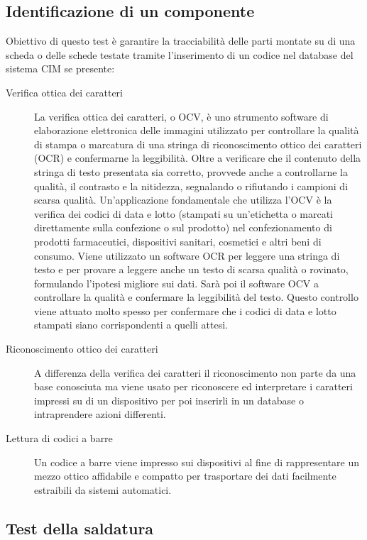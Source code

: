 \subsection{Identificazione di un componente}
Obiettivo di questo test è garantire la tracciabilità delle parti montate su di una scheda o delle schede
testate tramite l'inserimento di un codice nel database del sistema CIM se presente:
\begin{description}
\item[Verifica ottica dei caratteri]
La verifica ottica dei caratteri, o OCV, è uno strumento software di elaborazione elettronica delle immagini utilizzato per controllare la qualità di stampa o marcatura di una stringa di riconoscimento ottico dei caratteri (OCR) e confermarne la leggibilità. Oltre a verificare che il contenuto della stringa di testo presentata sia corretto, provvede anche a controllarne la qualità, il contrasto e la nitidezza, segnalando o rifiutando i campioni di scarsa qualità.
Un'applicazione fondamentale che utilizza l'OCV è la verifica dei codici di data e lotto (stampati su un'etichetta o marcati direttamente sulla confezione o sul prodotto) nel confezionamento di prodotti farmaceutici, dispositivi sanitari, cosmetici e altri beni di consumo.
Viene utilizzato un software OCR per leggere una stringa di testo e per provare a leggere anche un testo di scarsa qualità o rovinato, formulando l'ipotesi migliore sui dati. Sarà poi il software OCV a controllare la qualità e confermare la leggibilità del testo. Questo controllo viene attuato molto spesso per confermare che i codici di data e lotto stampati siano corrispondenti a quelli attesi.
\item [Riconoscimento ottico dei caratteri] A differenza della verifica dei caratteri il riconoscimento non parte da una base conosciuta ma viene usato per riconoscere ed interpretare i caratteri impressi su di un dispositivo per poi inserirli in un database o intraprendere azioni differenti.
\item [Lettura di codici a barre] Un codice a barre viene impresso sui dispositivi al fine di rappresentare un mezzo ottico affidabile e compatto per trasportare dei dati facilmente estraibili da sistemi automatici.

\end{description}

\subsection{Test della saldatura}

